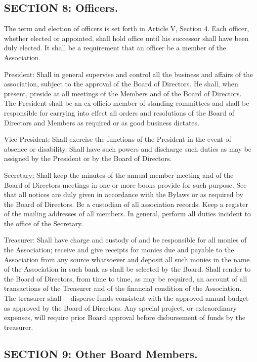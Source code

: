 \subsection{SECTION 8: Officers.}
The term and election of officers is set forth in Article V, Section
4. Each officer, whether elected or appointed, shall hold office until
his successor shall have been duly elected. It shall be a requirement
that an officer be a member of the Association.

President:  Shall in general supervise and control all the business
and affairs of the association, subject to the approval of the Board of
Directors. He shall, when present, preside at all meetings of the Members
and of the Board of Directors. The President shall be an ex-officio
member of standing committees and shall be responsible for carrying into
effect all orders and resolutions of the Board of Directors and Members
as required or as good business dictates.

Vice President: Shall exercise the functions of the President in the
event of absence or disability. Shall have such powers and discharge such
duties as may be assigned by the President or by the Board of Directors.

Secretary: Shall keep the minutes of the annual member meeting and of
the Board of Directors meetings in one or more books provide for such
purpose. See that all notices are duly given in accordance with the
Bylaws or as required by the Board of Directors. Be a custodian of
all association records. Keep a register of the mailing addresses of
all members. In general, perform all duties incident to the office of
the Secretary.

Treasurer: Shall have charge and custody of and be responsible for all
monies of the Association; receive and give receipts for monies due and
payable to the Association from any source whatsoever and deposit all such
monies in the name of the Association in such bank as shall be selected
by the Board. Shall render to the Board of Directors, from time to time,
as may be required, an account of all transactions of the Treasurer
and of the financial condition of the Association. The treasurer shall
   disperse funds consistent with the approved annual budget as
approved by the Board of Directors. Any special project, or extraordinary
expenses, will require prior Board approval before disbursement of funds
by the treasurer.

\subsection{SECTION 9: Other Board Members.}

